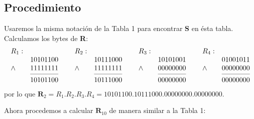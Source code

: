 \documentclass[stu, 12pt, letterpaper, donotrepeattitle, floatsintext, natbib]{apa7}
\begin{document}
\subsection*{Procedimiento}
Usaremos la misma notación de la Tabla 1 para encontrar \textbf{S} en ésta tabla. Calculamos los bytes de \textbf{R}:
\[
    \begin{matrix}
        \begin{array}{lr}
           R_1:   & \\
               & 10101100  \\ %
            \land  & 11111111 \\ %
            \cmidrule(lr){2-2}
              & 10101100  \\ %
            \end{array}\,\,
        & 
        \begin{array}{lr}
            R_2:   & \\
               & 10111000  \\
            \land  & 11111111 \\
            \cmidrule(lr){2-2}
              & 10111000  \\
            \end{array}\,\,
        & 
        \begin{array}{lr}
            R_3:   & \\
               & 10101001  \\
            \land  & 00000000 \\
            \cmidrule(lr){2-2}
              & 00000000  \\
            \end{array}\,\,
        & 
        \begin{array}{lr}
            R_4:   & \\
               & 01001011  \\
            \land  & 00000000 \\
            \cmidrule(lr){2-2}
              & 00000000  \\
            \end{array}
        \end{matrix}
\]
por lo que $\textbf{R}_2=R_1$.$R_2$.$R_3.R_4=10101100$.$10111000$.$00000000$.$00000000$.\par
\vspace{\baselineskip}
Ahora procedemos a calcular $\textbf{R}_{10}$ de manera similar a la Tabla 1:
\end{document}
